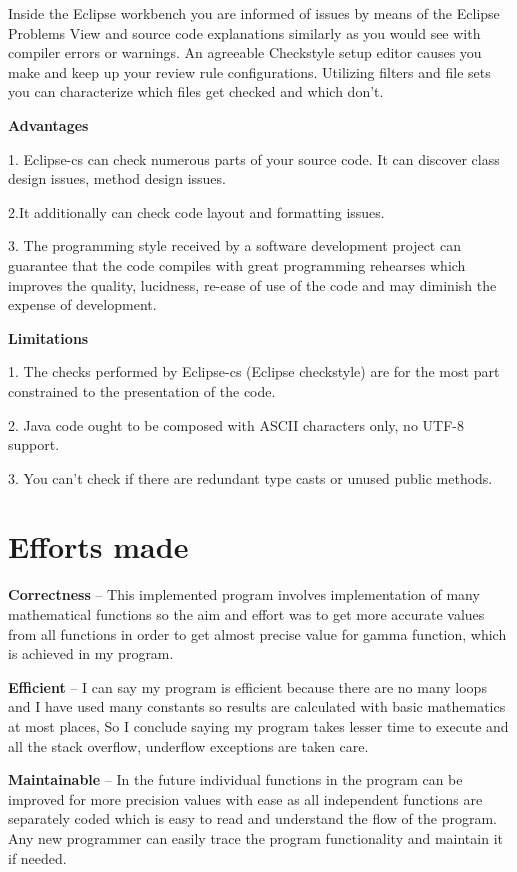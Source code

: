 \documentclass[12pt]{report}
\begin{document}
Inside the Eclipse workbench you are informed of issues by means of the Eclipse Problems View and source code explanations similarly as you would see with compiler errors or warnings. An agreeable Checkstyle setup editor causes you make and keep up your review rule configurations. Utilizing filters and file sets  you can characterize which files get checked and which don't.

\textbf{Advantages}

1. Eclipse-cs can check numerous parts of your source code. It can discover class design issues, method design issues. 

2.It additionally can check code layout and formatting issues. 

3. The programming style received by a software development project can guarantee that the code compiles with great programming rehearses which improves the quality, lucidness, re-ease of use of the code and may diminish the expense of development.


\textbf{Limitations}

1. The checks performed by Eclipse-cs (Eclipse checkstyle) are for the most part constrained to the presentation of the code.

2. Java code ought to be composed with ASCII characters only, no UTF-8 support. 

3. You can't check if there are redundant type casts or unused public methods.

\newpage
\section{Efforts made}

\textbf{Correctness}  – This implemented program involves implementation of many mathematical functions so the aim and effort was to get more accurate values from all functions in order to get almost precise value for gamma function, which is achieved in my program.

\textbf{Efficient}  – I can say my program is efficient because there are no many loops and I have used many constants so results are calculated with basic mathematics at most places, So I conclude saying my program takes lesser time to execute and all the stack overflow, underflow exceptions are taken care.

\textbf{Maintainable}  – In the future individual functions in the program can be improved for more precision values with ease as all independent functions are separately coded which is easy to read and understand the flow of the program. Any new programmer can easily trace the program functionality and maintain it if needed.
\end{document}
